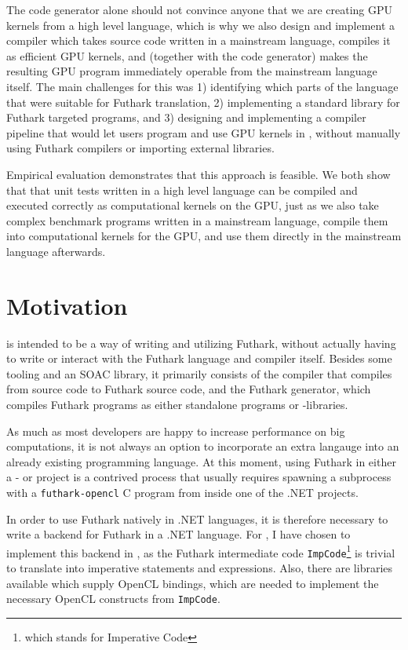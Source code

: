 The code generator alone should not convince anyone that we are creating GPU
kernels from a high level language, which is why we also design and implement a
compiler which takes source code written in a mainstream language, compiles it
as efficient GPU kernels, and (together with the code generator) makes the
resulting GPU program immediately operable from the mainstream language itself.  
The main challenges for this was 1) identifying which parts of the \fsharp{}
language that were suitable for Futhark translation, 2) implementing a standard
library for Futhark targeted \fsharp{} programs, and 3) designing and implementing a compiler
pipeline that would let users program and use GPU kernels in \fsharp{}, without
manually using Futhark compilers or importing external libraries.

Empirical evaluation demonstrates that this approach is feasible.
We both show that that unit tests written in a high level language can be compiled and executed
correctly as computational kernels on the GPU, just as we also take complex
benchmark programs written in a mainstream language, compile them into
computational kernels for the GPU, and use them directly in the mainstream
language afterwards.







\section*{Motivation}
\fshark{} is intended to be a way of writing and utilizing Futhark, without
actually having to write or interact with the Futhark language and compiler
itself. Besides some tooling and an \fsharp{} SOAC library, it primarily consists of the \fshark{} compiler that compiles from
\fsharp{} source code to Futhark source code, and the Futhark \csharp{}
generator, which compiles Futhark programs as either standalone \csharp{}
programs or -libraries.

As much as most developers are happy to increase performance on big
computations, it is not always an option to incorporate an extra langauge into
an already existing programming language. At this moment, using Futhark in
either a \csharp{}- or \fsharp{} project is a contrived process that usually
requires spawning a subprocess with a \texttt{futhark-opencl} C program from inside one of the .NET
projects.

In order to use Futhark natively in .NET languages, it is therefore
necessary to write a backend for Futhark in a .NET language.
For \fshark{}, I have chosen to implement this backend in \csharp{}, as the Futhark intermediate
code \texttt{ImpCode}\footnote{which stands for Imperative Code} is trivial to
translate into imperative \csharp{} statements and expressions.
Also, there are \csharp{} libraries available which supply OpenCL bindings, which are
needed to implement the necessary OpenCL constructs from \texttt{ImpCode}.

